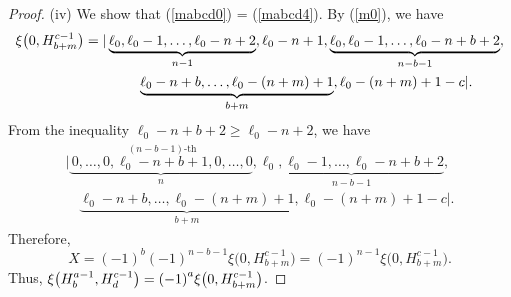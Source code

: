 \documentclass[pdftex]{sigma}
\numberwithin{equation}{section}
\begin{document}
\begin{proof}
(iv) We show that (\ref{mabcd0}) = (\ref{mabcd4}). By (\ref{m0}), we have
\begin{gather*}
\xi\bigl(0,H^{c-1}_{b+m}\bigr)=|\underbrace{\ell_{0},\ell_{0}-1,\dots,\ell_{0}-n+2}_{n-1}, {\ell_{0}-n+1},
\underbrace{\ell_{0},\ell_{0}-1,\dots,\ell_{0}-n+b+2}_{n-b-1},\\
\hphantom{\xi\bigl(0,H^{c-1}_{b+m}\bigr)=|}{}
\underbrace{\ell_{0}-n+b,\dots,\ell_{0}-(n+m)+1}_{b+m},\ell_{0}-(n+m)+1-c|\nonumber.
\end{gather*}
From the inequality $\ell_{0}-n+b+2\geq \ell_0-n+2$, we have
\begin{gather*}
|\underbrace{\,0,\dots,0,\stackrel{(n-b-1)\text{-th}}{\ell_{0}-n+b+1},0,\dots,0}_{n},\underbrace{\ell_{0},\ell_{0}-1,\dots,\ell_{0}-n+b+2}_{n-b-1},\\
\quad{}
\underbrace{\ell_{0}-n+b,\dots,\ell_{0}-(n+m)+1}_{b+m},\ell_{0}-(n+m)+1-c|\nonumber.
\end{gather*}
Therefore,
\[
X={(-1)}^{b}{(-1)}^{n-b-1}\xi\bigl(0,H^{c-1}_{b+m}\bigr)={(-1)}^{n-1}\xi\bigl(0,H^{c-1}_{b+m}\bigr).
\]
 Thus, $\xi\smash{\bigl(H^{a-1}_{b},H^{c-1}_{d}\bigr)}={(-1)}^{a}\xi\smash{\bigl(0,H^{c-1}_{b+m}\bigr)}$.
\end{proof}
\end{document}
